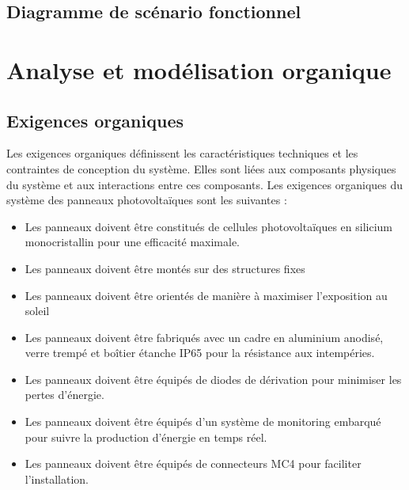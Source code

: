 \documentclass{article}
\begin{document}
\subsection{Diagramme de scénario fonctionnel}

\clearpage



\clearpage


\section{Analyse et modélisation organique}



\subsection{Exigences organiques}
Les exigences organiques définissent les caractéristiques techniques et les contraintes de conception du système. Elles sont liées aux composants physiques du système et aux interactions entre ces composants. Les exigences organiques du système des panneaux photovoltaïques sont les suivantes :
\begin{itemize}
    \item Les panneaux doivent être constitués de cellules photovoltaïques en silicium monocristallin pour une efficacité maximale.
    \item Les panneaux doivent être montés sur des structures fixes
    \item Les panneaux doivent être orientés de manière à maximiser l'exposition au soleil
    \item Les panneaux doivent être fabriqués avec un cadre en aluminium anodisé, verre trempé et boîtier étanche IP65 pour la résistance aux intempéries.
    \item Les panneaux doivent être équipés de diodes de dérivation pour minimiser les pertes d'énergie.
    \item Les panneaux doivent être équipés d'un système de monitoring embarqué pour suivre la production d'énergie en temps réel.
    \item Les panneaux doivent être équipés de connecteurs MC4 pour faciliter l’installation.
\end{itemize}
\end{document}
